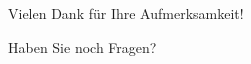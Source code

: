 \documentclass[utf8,t,aspectratio=169]{beamer}
\begin{document}
	\section*{}
    \begin{frame}[c]
      \Huge
      \centering
      Vielen Dank für Ihre Aufmerksamkeit!

      Haben Sie noch Fragen?
    \end{frame}
\end{document}
